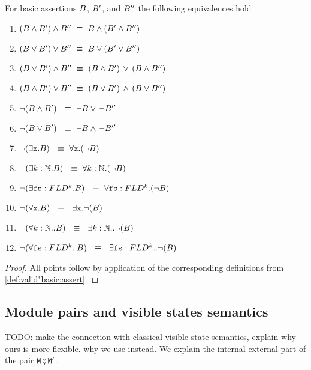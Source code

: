 \begin{lemma}
For   basic assertions $B$, $B'$, and $B''$ the following equivalences hold
\label{lemma:basic_assertions_classical}
\begin{enumerate}
\item
$(\SA \wedge \SAPrime) \wedge \SA'' \ \equiv \  \SA \wedge (\SAPrime \wedge \SA'')$
\item 
$(\SA \vee \SAPrime) \vee \SA'' \ \equiv \  \SA \vee (\SAPrime \vee\SA'')$
\item 
$(\SA \vee \SAPrime) \wedge \SA'' \ \equiv \  (\SA \wedge \SAPrime)\, \vee\, (\SA \wedge \SA'')$
\item 
$(\SA \wedge \SAPrime) \vee \SA'' \ \equiv \  (\SA \vee \SAPrime)\, \wedge\, (\SA \vee \SA'')$
\item 
$\neg (B \wedge B') \  \ \equiv \  \neg  B   \vee\, \neg B''$
\item 
$\neg (B \vee B') \  \ \equiv \  \neg  B   \wedge\, \neg B''$
\item
$\neg (\exists \prg{x}.\SA )  \  \ \equiv \  \forall \prg{x}.(\neg  \SA)$
\item
$\neg (\exists k:\mathbb{N}.\SA )  \  \ \equiv \  \forall  k:\mathbb{N}.(\neg  \SA)$
\item
$\neg (\exists {\mbox{\tt{fs}}}:FLD^k.B )  \  \ \equiv \  \forall {\mbox{\tt{fs}}}:FLD^k.(\neg  B)$
\item
$\neg (\forall \prg{x}. \SA)  \  \ \equiv \  \  \exists \prg{x}.\neg(\SA )$
\item
$\neg (\forall k:\mathbb{N}.. B)  \  \ \equiv \  \  \exists k:\mathbb{N}..\neg(B )$
\item
$\neg (\forall {\mbox{\tt{fs}}}:FLD^k.. B)  \  \ \equiv \  \  \exists {\mbox{\tt{fs}}}:FLD^k..\neg(B )$
\end{enumerate}
\end{lemma}
\begin{proof}
All points follow by application of the corresponding definitions from \ref{def:valid"basic:assert}.
 \end{proof}




\subsection{Module pairs and visible states semantics}

TODO: make the connection with classical visible state semantics, explain why ours is more flexible. why we use  instead. We explain the internal-external part of the pair ${\mbox{\tt{\ensuremath{{\mbox{\tt{M}}}}}}}\fatsemi{\mbox{\tt{\ensuremath{{\mbox{\tt{M}}}}}}}'$.

